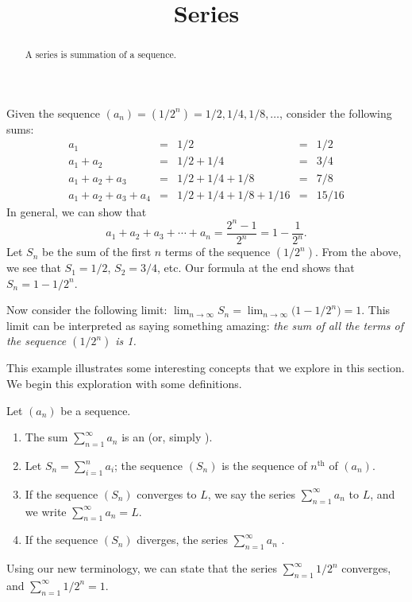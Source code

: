 \documentclass{ximera}
\title[Dig-In:]{Series}
\begin{document}
\begin{abstract}
A series is summation of a sequence.
\end{abstract}
\maketitle


Given the sequence $(a_n) = (1/2^n) = 1/2, 1/4, 1/8, \ldots$, consider
the following sums:
\[
\begin{array}{ccccc}
a_1				&=& 1/2					 &=& 1/2\\
a_1+a_2		&=& 1/2+1/4			 &=& 3/4\\
a_1+a_2+a_3 &=& 1/2+1/4+1/8  &=& 7/8\\
a_1+a_2+a_3+a_4 &=& 1/2+1/4+1/8+1/16 & =& 15/16
\end{array}
\]
In general, we can show that $$a_1+a_2+a_3+\cdots +a_n =
\frac{2^n-1}{2^n} = 1-\frac{1}{2^n}.$$ Let $S_n$ be the sum of the
first $n$ terms of the sequence $(1/2^n)$. From the above, we see
that $S_1=1/2$, $S_2 = 3/4$, etc. Our formula at the end shows that
$S_n = 1-1/2^n$.

Now consider the following limit: $\lim_{n\to\infty}S_n =
\lim_{n\to\infty}\big(1-1/2^n\big) = 1$. This limit can be interpreted
as saying something amazing: \emph{the sum of \emph{all} the terms of
  the sequence $(1/2^n)$ is 1.}

This example illustrates some interesting concepts that we explore in
this section. We begin this exploration with some definitions.

\begin{definition}
Let $(a_n)$ be a sequence.
\begin{enumerate}
\item The sum $\sum_{n=1}^\infty a_n$ is an  (or,
  simply ).
\item Let $S_n = \sum_{i=1}^n a_i$; the sequence $(S_n)$ is the
  sequence of $n^\text{th}$  of $(a_n)$.
\item If the sequence $(S_n)$ converges to $L$, we say the series
  $\sum_{n=1}^\infty a_n$  to $L$, and we write
  $\sum_{n=1}^\infty a_n = L$.
\item If the sequence $(S_n)$ diverges, the series $\sum_{n=1}^\infty
  a_n$ .
\end{enumerate}
\end{definition}

Using our new terminology, we can state that the series
$\sum_{n=1}^\infty 1/2^n$ converges, and $\sum_{n=1}^\infty 1/2^n =
1.$
\end{document}
